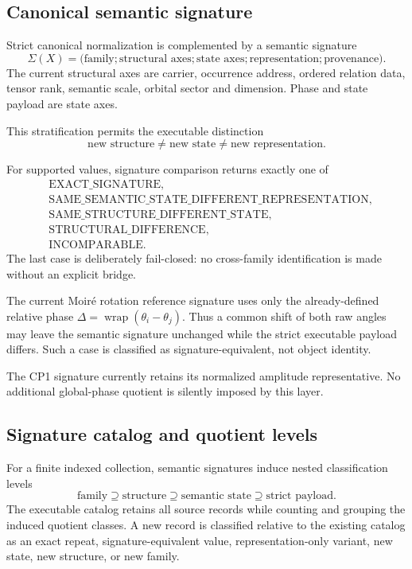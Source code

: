 \documentclass[11pt]{article}
\begin{document}
\subsection{Canonical semantic signature}

Strict canonical normalization is complemented by a semantic signature
\[
\Sigma(X)=
\bigl(
\text{family};
\text{structural axes};
\text{state axes};
\text{representation};
\text{provenance}
\bigr).
\]
The current structural axes are carrier, occurrence address, ordered relation
data, tensor rank, semantic scale, orbital sector and dimension. Phase and
state payload are state axes.

This stratification permits the executable distinction
\[
\boxed{
\text{new structure}
\neq
\text{new state}
\neq
\text{new representation}.
}
\]

For supported values, signature comparison returns exactly one of
\[
\begin{aligned}
&\mathrm{EXACT\_SIGNATURE},\\
&\mathrm{SAME\_SEMANTIC\_STATE\_DIFFERENT\_REPRESENTATION},\\
&\mathrm{SAME\_STRUCTURE\_DIFFERENT\_STATE},\\
&\mathrm{STRUCTURAL\_DIFFERENCE},\\
&\mathrm{INCOMPARABLE}.
\end{aligned}
\]
The last case is deliberately fail-closed: no cross-family identification is
made without an explicit bridge.

The current Moir\'e rotation reference signature uses only the already-defined
relative phase \(\Delta=\operatorname{wrap}(\theta_i-\theta_j)\). Thus a common
shift of both raw angles may leave the semantic signature unchanged while the
strict executable payload differs. Such a case is classified as
signature-equivalent, not object identity.

The CP1 signature currently retains its normalized amplitude representative.
No additional global-phase quotient is silently imposed by this layer.

\subsection{Signature catalog and quotient levels}

For a finite indexed collection, semantic signatures induce nested
classification levels
\[
\boxed{
\text{family}
\supseteq
\text{structure}
\supseteq
\text{semantic state}
\supseteq
\text{strict payload}.
}
\]
The executable catalog retains all source records while counting and grouping
the induced quotient classes. A new record is classified relative to the
existing catalog as an exact repeat, signature-equivalent value,
representation-only variant, new state, new structure, or new family.
\end{document}

